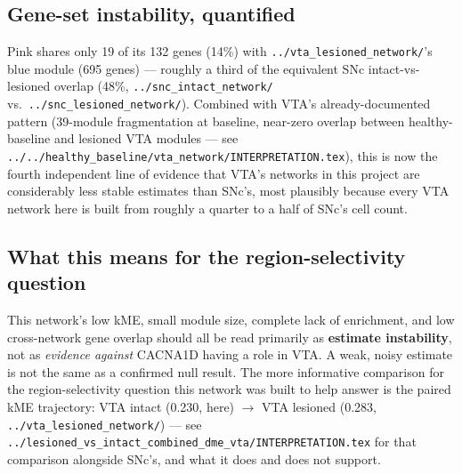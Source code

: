 \documentclass[11pt]{article}
\begin{document}
\subsection*{Gene-set instability, quantified}

Pink shares only 19 of its 132 genes (14\%) with \texttt{../vta\_lesioned\_network/}'s blue
module (695 genes) --- roughly a third of the equivalent SNc intact-vs-lesioned overlap
(48\%, \texttt{../snc\_intact\_network/} vs.\ \texttt{../snc\_lesioned\_network/}). Combined
with VTA's already-documented pattern (39-module fragmentation at baseline, near-zero
overlap between healthy-baseline and lesioned VTA modules --- see
\texttt{../../healthy\_baseline/vta\_network/INTERPRETATION.tex}), this is now the fourth
independent line of evidence that VTA's networks in this project are considerably less
stable estimates than SNc's, most plausibly because every VTA network here is built from
roughly a quarter to a half of SNc's cell count.

\subsection*{What this means for the region-selectivity question}

This network's low kME, small module size, complete lack of enrichment, and low
cross-network gene overlap should all be read primarily as \textbf{estimate instability},
not as \emph{evidence against} CACNA1D having a role in VTA. A weak, noisy estimate is not
the same as a confirmed null result. The more informative comparison for the
region-selectivity question this network was built to help answer is the paired
kME trajectory: VTA intact (0.230, here) $\to$ VTA lesioned (0.283,
\texttt{../vta\_lesioned\_network/}) --- see
\texttt{../lesioned\_vs\_intact\_combined\_dme\_vta/INTERPRETATION.tex} for that comparison
alongside SNc's, and what it does and does not support.
\end{document}
